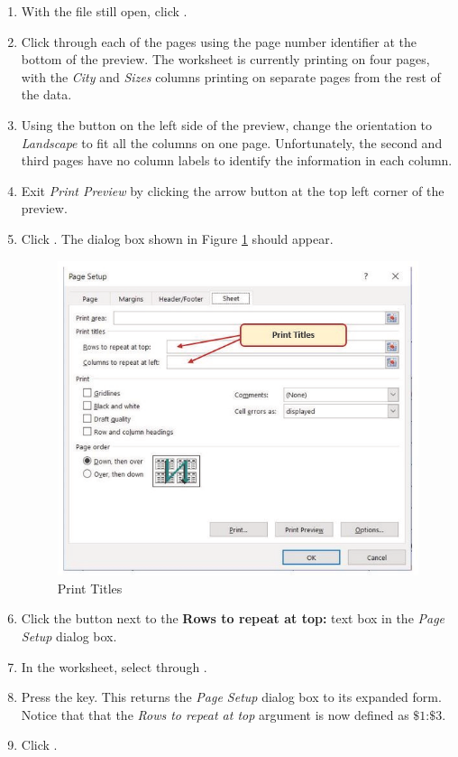 \begin{enumbox}
	\begin{enumerate}
		\item With the  file still open, click .
		\item Click through each of the pages using the page number identifier at the bottom of the preview. The worksheet is currently printing on four pages, with the \textit{City} and \textit{Sizes} columns printing on separate pages from the rest of the data.
		\item Using the  button on the left side of the preview, change the orientation to \textit{Landscape} to fit all the columns on one page. Unfortunately, the second and third pages have no column labels to identify the information in each column. 
		\item Exit \textit{Print Preview} by clicking the arrow button at the top left corner of the preview.
		\item Click . The dialog box shown in Figure \ref{03:fig29} should appear.
	
		\begin{figure}[H]
			\centering
			\includegraphics[width=\maxwidth{.95\linewidth}]{gfx/ch03_fig29}
			\caption{Print Titles}
			\label{03:fig29}
		\end{figure}

		\item Click the  button next to the \textbf{Rows to repeat at top:} text box in the \textit{Page Setup} dialog box.
		\item In the worksheet, select   through .
		\item Press the  key. This returns the \textit{Page Setup} dialog box to its expanded form. Notice that that the \textit{Rows to repeat at top} argument is now defined as $ \$1 $:$ \$3 $.
		\item Click .
	\end{enumerate}
\end{enumbox}


